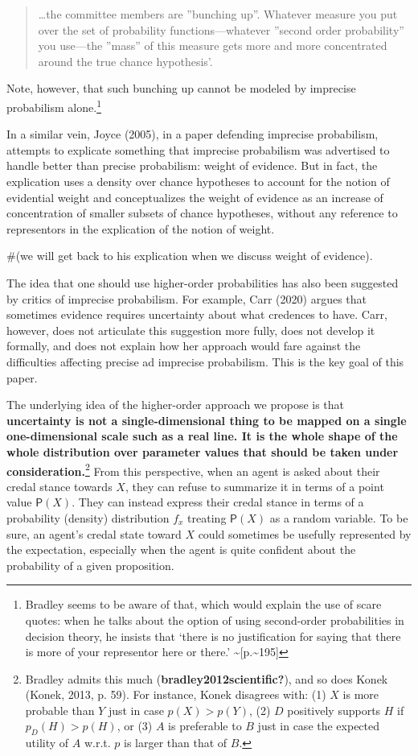\documentclass[
  letterpaper,
  DIV=11,
  numbers=noendperiod]{scrartcl}
\begin{document}
\begin{quote}
\dots the committee members are ''bunching up''. Whatever measure you put over the set of probability functions---whatever ''second order probability'' you use---the ''mass'' of this measure gets more and more concentrated around the true chance hypothesis'.
\end{quote}

\noindent Note, however, that such bunching up cannot be modeled by
imprecise probabilism alone.\footnote{Bradley seems to be aware of that,
  which would explain the use of scare quotes: when he talks about the
  option of using second-order probabilities in decision theory, he
  insists that `there is no justification for saying that there is more
  of your representor here or there.'
  \textasciitilde{[}p.\textasciitilde195{]}}

In a similar vein, Joyce (2005), in a paper defending imprecise
probabilism, attempts to explicate something that imprecise probabilism
was advertised to handle better than precise probabilism: weight of
evidence. But in fact, the explication uses a density over chance
hypotheses to account for the notion of evidential weight and
conceptualizes the weight of evidence as an increase of concentration of
smaller subsets of chance hypotheses, without any reference to
representors in the explication of the notion of weight.

\#(we will get back to his explication when we discuss weight of
evidence).

The idea that one should use higher-order probabilities has also been
suggested by critics of imprecise probabilism. For example, Carr (2020)
argues that sometimes evidence requires uncertainty about what credences
to have. Carr, however, does not articulate this suggestion more fully,
does not develop it formally, and does not explain how her approach
would fare against the difficulties affecting precise ad imprecise
probabilism. This is the key goal of this paper.

The underlying idea of the higher-order approach we propose is that
\textbf{uncertainty is not a single-dimensional thing to be mapped on a
single one-dimensional scale such as a real line. It is the whole shape
of the whole distribution over parameter values that should be taken
under consideration.}\footnote{Bradley admits this much
  (\textbf{bradley2012scientific?}), and so does Konek (Konek, 2013, p.
  59). For instance, Konek disagrees with: (1) \(X\) is more probable
  than \(Y\) just in case \(p(X)>p(Y)\), (2) \(D\) positively supports
  \(H\) if \(p_D(H)> p(H)\), or (3) \(A\) is preferable to \(B\) just in
  case the expected utility of \(A\) w.r.t. \(p\) is larger than that of
  \(B\).} From this perspective, when an agent is asked about their
credal stance towards \(X\), they can refuse to summarize it in terms of
a point value \(\mathsf{P}(X)\). They can instead express their credal
stance in terms of a probability (density) distribution \(f_x\) treating
\(\mathsf{P}(X)\) as a random variable. To be sure, an agent's credal
state toward \(X\) could sometimes be usefully represented by the
expectation, especially when the agent is quite confident about the
probability of a given proposition.
\end{document}
